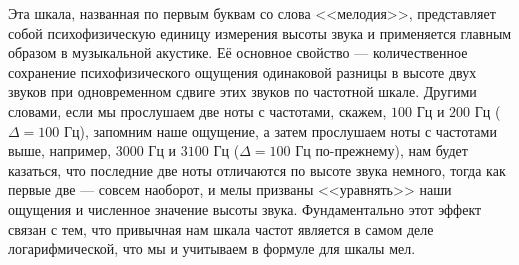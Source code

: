 \documentclass[12pt]{gost-7-32}
\begin{document}
Эта шкала, названная по первым буквам со слова <<мелодия>>, представляет собой психофизическую единицу измерения высоты звука и применяется главным образом в музыкальной акустике.
Её основное свойство --- количественное сохранение психофизического ощущения одинаковой разницы в высоте двух звуков при одновременном сдвиге этих звуков по частотной шкале.
Другими словами, если мы прослушаем две ноты с частотами, скажем, $100$ Гц и $200$ Гц ($\Delta = 100$ Гц), запомним наше ощущение, а затем прослушаем ноты с частотами выше, например, $3000$ Гц и $3100$ Гц ($\Delta = 100$ Гц по-прежнему), нам будет казаться, что последние две ноты отличаются по высоте звука немного, тогда как первые две --- совсем наоборот, и мелы призваны <<уравнять>> наши ощущения и численное значение высоты звука.
Фундаментально этот эффект связан с тем, что привычная нам шкала частот является в самом деле логарифмической, что мы и учитываем в формуле для шкалы мел.
\end{document}
